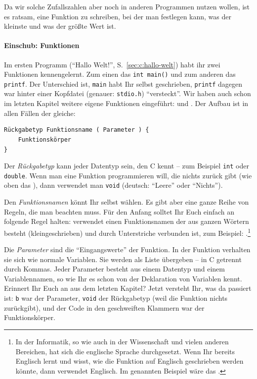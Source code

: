 Da wir solche Zufallszahlen aber noch in anderen Programmen nutzen wollen, ist es ratsam, eine Funktion zu schreiben, bei der man festlegen kann, was der kleinste und was der größte Wert ist. 

\paragraph{\textbf{Einschub}: Funktionen} %

Im ersten Programm (``Hallo Welt!'', S.~\ref{sec:c:hallo-welt}) habt ihr zwei Funktionen kennengelernt. Zum einen das \texttt{int main()} und zum anderen das \texttt{printf}. Der Unterschied ist, \texttt{main} habt Ihr selbst geschrieben, \texttt{printf} dagegen war hinter einer Kopfdatei (genauer: \texttt{stdio.h}) ``versteckt''. Wir haben auch schon im letzten Kapitel weitere eigene Funktionen eingeführt:  und . Der Aufbau ist in allen Fällen der gleiche:
\begin{verbatim}
Rückgabetyp Funktionsname ( Parameter ) {
    Funktionskörper
}
\end{verbatim}
Der \emph{Rückgabetyp} kann jeder Datentyp sein, den C kennt -- zum Beispiel \texttt{int} oder \texttt{double}. Wenn man eine Funktion programmieren will, die nichts zurück gibt (wie oben das ), dann verwendet man \texttt{void} (deutsch: ``Leere'' oder ``Nichts'').

Den \emph{Funktionsnamen} könnt Ihr selbst wählen. Es gibt aber eine ganze Reihe von Regeln, die man beachten muss. Für den Anfang solltet Ihr Euch einfach an folgende Regel halten: verwendet einen Funktionsnamen der aus ganzen Wörtern besteht (kleingeschrieben) und durch Unterstriche verbunden ist, zum Beispiel: .\footnote{%
    In der Informatik, so wie auch in der Wissenschaft und vielen anderen Bereichen, hat sich die englische Sprache durchgesetzt. Wenn Ihr bereits Englisch lernt und wisst, wie die Funktion auf Englisch geschrieben werden könnte, dann verwendet Englisch. Im genannten Beispiel wäre das .}

Die \emph{Parameter} sind die ``Eingangswerte'' der Funktion. In der Funktion verhalten sie sich wie normale Variablen. Sie werden als Liste übergeben -- in C getrennt durch Kommas. Jeder Parameter besteht aus einem Datentyp und einem Variablennamen, so wie Ihr es schon von der Deklaration von Variablen kennt. Erinnert Ihr Euch an  aus dem letzten Kapitel? Jetzt versteht Ihr, was da passiert ist: \texttt{b} war der Parameter, \texttt{void} der Rückgabetyp (weil die Funktion nichts zurückgibt), und der Code in den geschweiften Klammern war der Funktionskörper.

